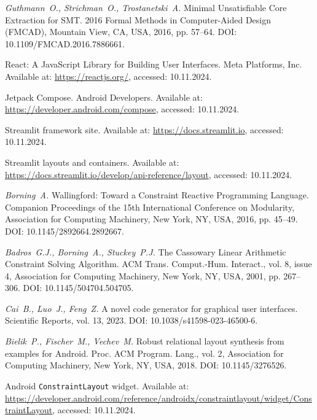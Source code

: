{\em Guthmann~O., Strichman~O., Trostanetski~A.} Minimal Unsatisfiable Core Extraction for SMT. 2016 Formal Methods in Computer-Aided Design (FMCAD), Mountain View, CA, USA, 2016, pp. 57--64. DOI: 10.1109/FMCAD.2016.7886661.

React: A JavaScript Library for Building User Interfaces. Meta Platforms, Inc. Available at: \url{https://reactjs.org/}, accessed: 10.11.2024.

Jetpack Compose. Android Developers. Available at: \url{https://developer.android.com/compose}, accessed: 10.11.2024.


Streamlit framework site. Available at: \url{https://docs.streamlit.io}, accessed: 10.11.2024.


Streamlit layouts and containers. Available at: \url{https://docs.streamlit.io/develop/api-reference/layout}, accessed: 10.11.2024.

{\em Borning~A.} Wallingford: Toward a Constraint Reactive Programming Language. Companion Proceedings of the 15th International Conference on Modularity, Association for Computing Machinery, New York, NY, USA, 2016, pp. 45--49. DOI: 10.1145/2892664.2892667.

{\em Badros~G.J., Borning~A., Stuckey~P.J.} The Cassowary Linear Arithmetic Constraint Solving Algorithm. ACM Trans. Comput.-Hum. Interact., vol. 8, issue 4, Association for Computing Machinery, New York, NY, USA, 2001, pp. 267--306. DOI: 10.1145/504704.504705.

{\em Cai~B., Luo~J., Feng~Z.} A novel code generator for graphical user interfaces. Scientific Reports, vol. 13, 2023. DOI: 10.1038/s41598-023-46500-6.

{\em Bielik~P., Fischer~M., Vechev~M.} Robust relational layout synthesis from examples for Android. Proc. ACM Program. Lang., vol. 2, Association for Computing Machinery, New York, NY, USA, 2018. DOI: 10.1145/3276526.

\choicelang{}{ \newpage }

Android \texttt{ConstraintLayout} widget. Available at: \url{https://developer.android.com/reference/androidx/constraintlayout/widget/ConstraintLayout}, accessed: 10.11.2024.

